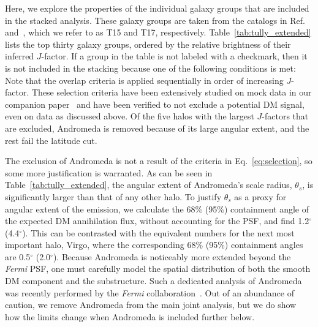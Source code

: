   Here, we explore the properties of the individual galaxy groups that are included in the stacked analysis.  These galaxy groups are taken from the catalogs in Ref.~\cite{Tully:2015opa} and~\cite{2017ApJ...843...16K}, which we refer to as T15 and T17, respectively.  Table~\ref{tab:tully_extended} lists the top thirty galaxy groups, ordered by the relative brightness of their inferred $J$-factor.  If a group in the table is not labeled with a checkmark, then it is not included in the stacking because one of the following conditions is met:
Note that the overlap criteria is applied sequentially in order of increasing $J$-factor.
These selection criteria have been extensively studied on mock data in our companion paper~\cite{companion} and have been verified to not exclude a potential DM signal, even on data as discussed above. Of the five halos with the largest $J$-factors that are excluded, Andromeda is removed because of its large angular extent, and the rest fail the latitude cut. 

The exclusion of Andromeda is not a result of the criteria in Eq.~\ref{eq:selection}, so some more justification is warranted. As can be seen in Table~\ref{tab:tully_extended}, the angular extent of Andromeda's  scale radius, $\theta_{s}$, is significantly larger than that of any other halo.  To justify $\theta_{s}$ as a proxy for angular extent of the emission, we calculate the 68\% (95\%) containment angle of the expected DM annihilation flux, without accounting for the PSF, and find 1.2$^{\circ}$ (4.4$^{\circ}$). This can be contrasted with the equivalent numbers for the next most important halo, Virgo, where the corresponding  68\% (95\%) containment angles are 0.5$^{\circ}$ (2.0$^{\circ}$). 
Because Andromeda is noticeably more extended beyond the \textit{Fermi} PSF, one must carefully model the spatial distribution of both the smooth DM component and the substructure.  Such a dedicated analysis of Andromeda was recently performed by the \emph{Fermi} collaboration~\cite{Ackermann:2017nya}.  Out of an abundance of caution, we remove Andromeda from the main joint analysis, but we do show how the limits change when Andromeda is included further below.

